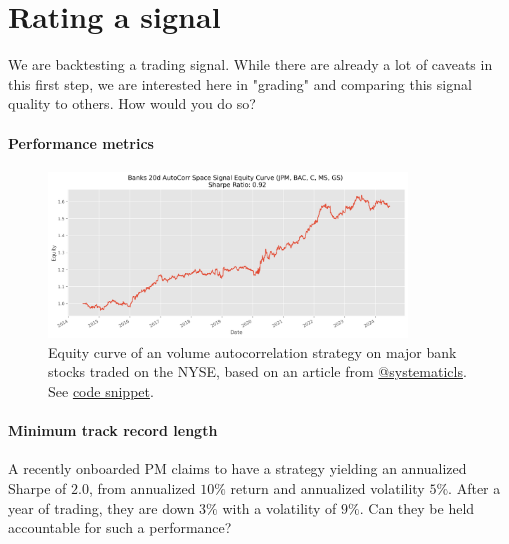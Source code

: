 \section{Rating a signal}

\begin{tcolorbox}[width=\linewidth, sharp corners=all, colback=white!95!black]
We are backtesting a trading signal. While there are already a lot of caveats in this first step, we are interested here in "grading" and comparing this signal quality to others. How would you do so?
\end{tcolorbox}

\paragraph*{Performance metrics}



\begin{figure}[H]
    \includegraphics[width=0.85\textwidth]{include/img/banks_statarb_equity_curve.png}
    \centering
    \caption{Equity curve of an volume autocorrelation strategy on major bank stocks traded on the NYSE, based on an article from \href{https://x.com/systematicls/status/1802666506125558115}{@systematicls}. See \href{https://github.com/vtisserand/quant_itws/tree/main/code/snippets/bank_statarb_signal.py}{code snippet}.}
    \label{fig:banks_equity_curve}
\end{figure}

\paragraph*{Minimum track record length}

A recently onboarded PM claims to have a strategy yielding an annualized Sharpe of $2.0$, from annualized $10\%$ return and annualized volatility $5\%$. After a year of trading, they are down $3\%$ with a volatility of $9\%$. Can they be held accountable for such a performance?

